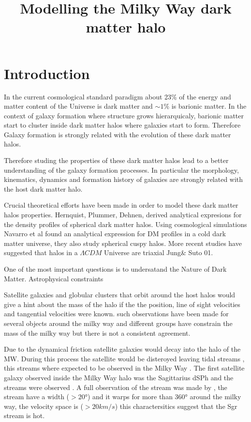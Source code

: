 \documentclass[12pt]{article}
\title{\begin{LARGE}
{Modelling the Milky Way dark matter halo}
\end{LARGE}}
\begin{document}
\maketitle

\section{Introduction}

In the current cosmological standard paradigm about 23\% of the energy and matter
content of the Universe is dark matter and $\sim 1\%$ is barionic matter. In the
context of galaxy formation where structure grows hierarquicaly, barionic matter
start to cluster inside dark matter halos where galaxies start to form. Therefore
Galaxy formation is strongly related with the evolution of these dark matter halos. 



Therefore studing the properties of these dark matter halos lead to a better understanding
of the galaxy formation processes. In particular the morphology, kinematics, dynamics
and formation history of galaxies are strongly related with the host dark matter halo. 


     
Crucial theoretical efforts have been made in order to model these dark matter halos 
properties. Hernquist, Plummer, Dehnen, derived analytical expresions for the density 
profiles of spherical dark matter halos. Using cosmological simulations Navarro et al 
found an analytical expression for DM profiles in a cold dark matter universe, they also 
study spherical cuspy halos. More recent studies have suggested that halos in a 
$\Lambda CDM$ Universe are triaxial Jung\& Suto 01. 

One of the most important questions is to undersatand the Nature of Dark Matter. Astrophysical 
constraints    

Satellite galaxies and globular clusters that orbit around the host halos would give 
a hint about the mass of the halo if the the position, line of sight velocities and tangential velocities
were known. such observations have been made for several objects around the milky way and 
different groups have constrain the mass of the milky way but there is not a consistent 
agreement.  

Due to the dynamical friction satellite galaxies would decay into the halo of the MW. During this 
process the satellite would be disteroyed leaving tidal streams \citep{toomretoomre72}, 
this streams where expected to be observed in the Milky Way \citep{lblb95, jhonston96}. 
The first satellite galaxy observed inside the Milky Way halo was the Sagittarius dSPh \citep{ibata94} 
and the streams were observed \citep{ivezic00, yanny00, ibata01b}. A full observation 
of the stream was made by \citep{majewsky03}, the stream  have a width ($>20°$) \citep{belokurov06} and it warps
for more than $360°$\citep{majewsky03, piladiaz13, belokurov14} around the milky way, 
the velocity space is ($>20km/s$) \citep{koposov13} this charactersitics suggest that
the Sgr stream is hot. 
\end{document}
